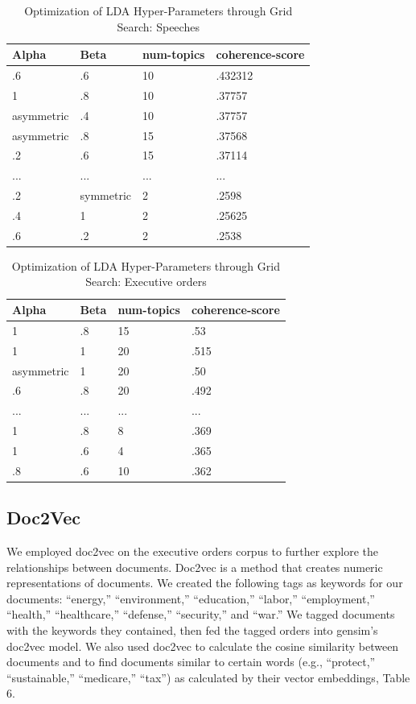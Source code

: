 \documentclass{article}
\begin{document}
{{\begin{table}[H]
	\caption{Optimization of LDA Hyper-Parameters through Grid Search: Speeches}
	\centering
	\begin{tabular}{llll}
		\toprule
		\midrule
		Alpha  & Beta & num-topics & coherence-score\\
		\midrule
		\midrule
		.6 & .6 & 10 & .432312   \\
		\midrule
		1 & .8 & 10 & .37757     \\
		\midrule
		asymmetric & .4 & 10 & .37757  \\
		\midrule
		asymmetric & .8 & 15 & .37568  \\
		\midrule 
		.2 & .6 & 15 & .37114    \\
		\midrule 
		... & ... & ... & ...    \\
		\midrule 
		.2 & symmetric & 2 & .2598    \\
		\midrule 
		.4 & 1 & 2 & .25625   \\
		\midrule 
		.6 & .2 & 2 & .2538   \\
		\bottomrule
	\end{tabular}
\end{table}

\begin{table}[H]
	\caption{Optimization of LDA Hyper-Parameters through Grid Search: Executive orders}
	\centering
	\begin{tabular}{llll}
		\toprule
		\midrule
		Alpha  & Beta & num-topics & coherence-score\\
		\midrule
		\midrule
		1 & .8 & 15 & .53   \\
		\midrule
		1 & 1 & 20 & .515     \\
		\midrule
		asymmetric & 1 & 20 & .50  \\
		\midrule
		.6 & .8 & 20 & .492  \\
		\midrule 
		... & ... & ... & ...    \\
		\midrule 
		1 & .8 & 8 & .369    \\
		\midrule 
		1 & .6 & 4 & .365   \\
		\midrule 
		.8 & .6 & 10 & .362  \\
		\bottomrule
	\end{tabular}
\end{table}

}

\subsection{Doc2Vec}{We employed doc2vec on the executive orders corpus to further explore the relationships between documents. Doc2vec is a method that creates numeric representations of documents. We created the following tags as keywords for our documents: “energy,” “environment,” “education,” “labor,” “employment,” “health,” “healthcare,” “defense,” “security,” and “war.” We tagged documents with the keywords they contained, then fed the tagged orders into gensim’s doc2vec model. We also used doc2vec to calculate the cosine similarity between documents and to find documents similar to certain words (e.g., “protect,” “sustainable,” “medicare,” “tax”) as calculated by their vector embeddings, Table 6.}

}
\end{document}
